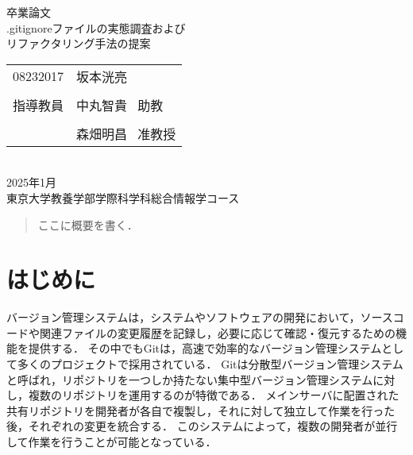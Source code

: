 \documentclass[a4paper,xelatex,ja=standard,fontsize=11pt]{bxjsreport}
\begin{document}
\begin{titlepage}
	\begin{center}
		\vspace*{\fill}
		\vspace{40pt}
		{\Large 卒業論文}
		\vspace{20pt} \\
		{\huge .gitignoreファイルの実態調査および \\\vspace{10pt} リファクタリング手法の提案} \\
		\vspace{160pt}
		\begin{tabular}{rl}
			{\Large 08232017} & {\LARGE 坂本洸亮}       \\
			\vspace{10pt}                           \\
			{\Large 指導教員}     & {\Large 中丸智貴 \ 助教}  \\
			\vspace{-10pt}                          \\
			                  & {\Large 森畑明昌 \ 准教授}
		\end{tabular}
		\vspace{60pt} \\
		{\Large 2025年1月}
		\vspace{60pt} \\
		{\Large 東京大学教養学部学際科学科総合情報学コース}
		\vspace*{\fill}
	\end{center}
\end{titlepage}

\begin{abstract}
	ここに概要を書く．
\end{abstract}

\setcounter{tocdepth}{2}
\tableofcontents
\thispagestyle{empty}
\restoregeometry

\mainmatter

\pagestyle{headings}

%
\chapter{はじめに}

バージョン管理システムは，システムやソフトウェアの開発において，ソースコードや関連ファイルの変更履歴を記録し，必要に応じて確認・復元するための機能を提供する．
その中でもGitは，高速で効率的なバージョン管理システムとして多くのプロジェクトで採用されている．
Gitは分散型バージョン管理システムと呼ばれ，リポジトリを一つしか持たない集中型バージョン管理システムに対し，複数のリポジトリを運用するのが特徴である．
メインサーバに配置された共有リポジトリを開発者が各自で複製し，それに対して独立して作業を行った後，それぞれの変更を統合する．
このシステムによって，複数の開発者が並行して作業を行うことが可能となっている．
\end{document}
